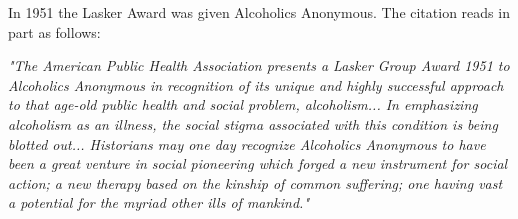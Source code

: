 


\begin{biblechapter}
\verse In 1951 the Lasker Award was given Alcoholics Anonymous.
\verse The citation reads in part as follows:


    \emph{"The American Public Health Association 
    presents a Lasker Group Award 1951 to Alcoholics Anonymous
    in recognition of its unique and highly successful approach 
    to that age-old public health and social problem,
    alcoholism...
\verse In emphasizing alcoholism as an illness,
    the social stigma associated with this condition is being
    blotted out...
\verse Historians may one day recognize Alcoholics Anonymous 
    to have been a great venture in social pioneering 
    which forged a new instrument for social action; 
    a new therapy based on the kinship of common suffering; 
    one having vast a potential for the myriad other ills of mankind."
}
\end{biblechapter}
